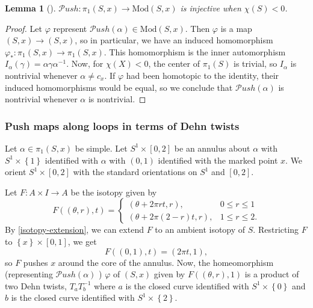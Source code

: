 \documentclass[reqno]{amsart}
\newtheorem{lemma}[theorem]{Lemma}
\theoremstyle{definition}
\theoremstyle{remark}
\newcommand{\Mod}{{\mathrm{Mod}}}
\newcommand{\Push}{{\mathcal{P}}ush}
\begin{document}
 \begin{lemma}[]
     $\Push \colon \pi_1 \left( S,x \right) 
     \to \Mod (S,x)$ is injective when
     $\chi (S) <0$.
 \end{lemma}

 \begin{proof}
     Let $\varphi $ represent 
     $\Push \left( \alpha \right) \in 
     \Mod \left( S,x \right) $. Then
     $\varphi $ is a map
     $\left( S,x \right) \to \left( S,x \right) $, so
     in particular, we have an induced homomorphism
     $\varphi_* \colon \pi_1 \left( S,x \right) 
     \to \pi_1 \left( S,x \right) $.
     This homomorphism is the inner automorphism
     $I_{\alpha} (\gamma) = \alpha \gamma \alpha^{-1}$.
     Now, for $\chi (X) < 0$, the center of $\pi_1 (S)$ is
     trivial, so $I_{\alpha}$ is nontrivial whenever
     $\alpha \neq c_{x}$. If $\varphi $ had been
     homotopic to the identity, their
     induced homomorphisms would be equal, so we conclude
     that $\Push \left( \alpha \right) $ is nontrivial whenever
     $\alpha$ is nontrivial.
 \end{proof}

 \subsubsection{Push maps along loops in terms of Dehn twists}

 Let $\alpha \in \pi_1 \left( S,x \right) $ be simple.
 Let $S^{1} \times \left[ 0,2 \right] $ be an annulus
 about $\alpha$ with $S^{1} \times \left\{ 1 \right\} $ 
 identified with $\alpha$ with
 $(0,1)$ identified with the marked point
 $x$. We orient 
 $S^{1} \times \left[ 0,2 \right] $ with the
 standard orientations on
 $S^{1}$ and $\left[ 0,2 \right] $. 

 Let $F \colon A \times I \to A$ be the
 isotopy given by
 \[
 F \left( \left( \theta,r \right) ,t \right) 
 = 
 \begin{cases}
     \left( \theta + 2\pi r t, r \right) ,& 0 \le r \le 1\\
     \left( \theta + 2 \pi (2-r)t,r \right) ,& 1 \le r \le 2.
 \end{cases}
 \]
 By \ref{isotopy-extension}, we can extend
 $F$ to an ambient isotopy of $S$. Restricting
 $F$ to $\left\{ x \right\} \times \left[ 0,1 \right] $, we
 get
 \[
 F\left( (0,1),t \right) = \left( 2 \pi t,1 \right),
 \] 
 so $F$ pushes $x$ around the core of the annulus.
 Now, the homeomorphism (representing $\Push\left( \alpha \right) $ )
 $\varphi $ of $\left( S,x \right) $ given by
 $F\left( (\theta, r),1 \right) $ is a product
 of two Dehn twists,  $T_a T_{b}^{-1}$ where
 $a$ is the closed curve identified with
 $S^{1} \times \left\{ 0 \right\} $ and
 $b$ is the closed curve identified with
 $S^{1} \times \left\{ 2 \right\} $.
\end{document}
